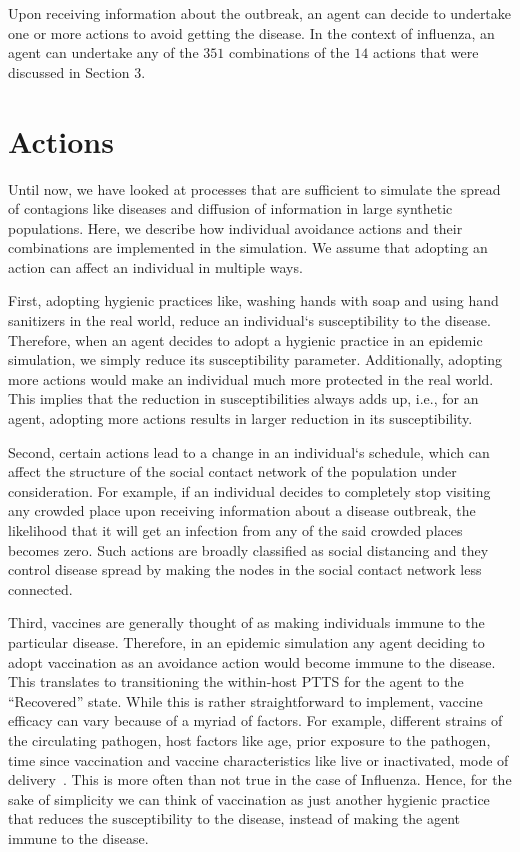 \documentclass[doublespace]{VTthesis}
\begin{document}
    Upon receiving information about the outbreak, an agent can decide to undertake one or more actions to avoid getting the disease. In the context of influenza, an agent can undertake any of the $351$ combinations of the $14$ actions that were discussed in Section 3. 
    
    \section{Actions}
    
    Until now, we have looked at processes that are sufficient to simulate the spread of contagions like diseases and diffusion of information in large synthetic populations. Here, we describe how individual avoidance actions and their combinations are implemented in the simulation. We assume that adopting an action can affect an individual in multiple ways. 
    
    First, adopting hygienic practices like, washing hands with soap and using hand sanitizers in the real world, reduce an individual`s susceptibility to the disease. Therefore, when an agent decides to adopt a hygienic practice in an epidemic simulation, we simply reduce its susceptibility parameter. Additionally, adopting more actions would make an individual much more protected in the real world. This implies that the reduction in susceptibilities always adds up, i.e., for an agent, adopting more actions results in larger reduction in its susceptibility. 
    
    Second, certain actions lead to a change in an individual`s schedule, which can affect the structure of the social contact network of the population under consideration. For example, if an individual decides to completely stop visiting any crowded place upon receiving information about a disease outbreak, the likelihood that it will get an infection from any of the said crowded places becomes zero. Such actions are broadly classified as social distancing and they control disease spread by making the nodes in the social contact network less connected. 
    
    Third, vaccines are generally thought of as making individuals immune to the particular disease. Therefore, in an epidemic simulation any agent deciding to adopt vaccination as an avoidance action would become immune to the disease. This translates to transitioning the within-host PTTS for the agent to the ``Recovered'' state. While this is rather straightforward to implement, vaccine efficacy can vary because of a myriad of factors. For example, different strains of the circulating pathogen, host factors like age, prior exposure to the pathogen, time since vaccination and vaccine characteristics like live or inactivated, mode of delivery~\cite{mcneil2012over}. This is more often than not true in the case of Influenza. Hence, for the sake of simplicity we can think of vaccination as just another hygienic practice that reduces the susceptibility to the disease, instead of making the agent immune to the disease.
    
\end{document}

